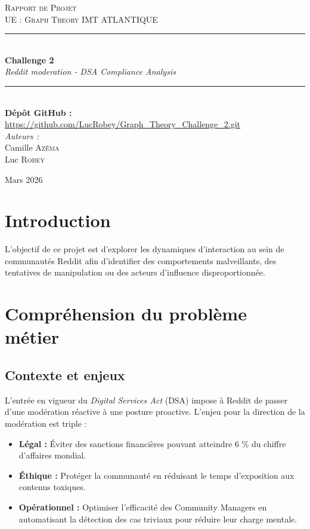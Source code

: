 \documentclass[12pt]{report}
\newcommand{\HRule}{\rule{\linewidth}{0.5mm}}
\begin{document}
\begin{titlepage}
    \centering
    
    \vspace*{2cm}
    
    \textsc{\Large Rapport de Projet}\\[0.5cm]
    \textsc{\large UE : Graph Theory IMT ATLANTIQUE}\\[2cm]
    
    \HRule \\[0.4cm]
    {\huge \bfseries  Challenge 2 }\\[0.2cm]
    {\large \textit{Reddit moderation - DSA Compliance Analysis}}\\[0.4cm]
    \HRule \\[2cm] %

    {\large \textbf{Dépôt GitHub :}} \\[0.2cm]
    {\small \url{https://github.com/LucRobey/Graph_Theory_Challenge_2.git}} \\[1.5cm]
    
    {\large \emph{Auteurs :}}\\[0.5cm]
    {\Large Camille \textsc{Azéma}}\\[0.2cm]
    {\Large Luc \textsc{Robey}}
    
    \vfill  
    {\large Mars 2026}
    
\end{titlepage}

\renewcommand{\contentsname}{Sommaire}
\tableofcontents
\newpage

\section{Introduction}
L'objectif de ce projet est d'explorer les dynamiques d'interaction au sein de communautés Reddit afin d'identifier des comportements malveillants, des tentatives de manipulation ou des acteurs d'influence disproportionnée. 

\section{Compréhension du problème métier}
\subsection{Contexte et enjeux}
L'entrée en vigueur du \textit{Digital Services Act} (DSA) impose à Reddit de passer d'une modération réactive à une posture proactive. L'enjeu pour la direction de la modération est triple :
\begin{itemize}
    \item \textbf{Légal :} Éviter des sanctions financières pouvant atteindre 6 \% du chiffre d'affaires mondial.
    \item \textbf{Éthique :} Protéger la communauté en réduisant le temps d'exposition aux contenus toxiques.
    \item \textbf{Opérationnel :} Optimiser l'efficacité des Community Managers en automatisant la détection des cas triviaux pour réduire leur charge mentale.
\end{itemize}
\end{document}
